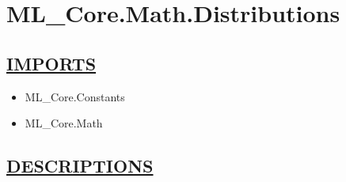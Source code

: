 \chapter*{ML\_Core.Math.Distributions}
\hypertarget{ecldoc:toc:ML_Core.Math.Distributions}{}

\section*{\underline{IMPORTS}}
\begin{itemize}
\item ML\_Core.Constants
\item ML\_Core.Math
\end{itemize}

\section*{\underline{DESCRIPTIONS}}
